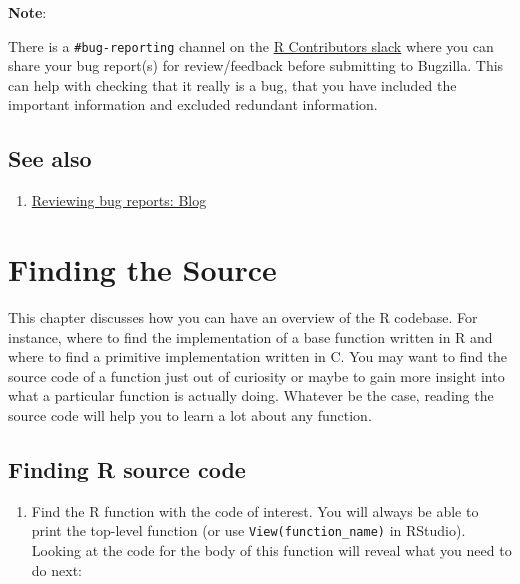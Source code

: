 \documentclass[
]{book}
\providecommand{\tightlist}{%
  \setlength{\itemsep}{0pt}\setlength{\parskip}{0pt}}
\begin{document}
\textbf{Note}:

There is a \texttt{\#bug-reporting} channel on the \href{https://r-contributors.slack.com/}{R Contributors slack} where you can share your bug report(s) for review/feedback before submitting to Bugzilla. This can help with checking that it really is a bug, that you have included the important information and excluded redundant information.

\section{See also}\label{see-also-2}

\begin{enumerate}
\def\labelenumi{\arabic{enumi}.}
\tightlist
\item
  \href{https://blog.r-project.org/2019/10/09/r-can-use-your-help-reviewing-bug-reports/index.html}{Reviewing bug reports: Blog}
\end{enumerate}

\chapter{Finding the Source}\label{FindSource}

This chapter discusses how you can have an overview of the R codebase. For instance, where to find the implementation of a base function written in R and where to find a primitive implementation written in C. You may want to find the source code of a function just out of curiosity or maybe to gain more insight into what a particular function is actually doing. Whatever be the case, reading the source code will help you to learn a lot about any function.

\section{Finding R source code}\label{finding-r-source-code}

\begin{enumerate}
\def\labelenumi{\arabic{enumi}.}
\tightlist
\item
  Find the R function with the code of interest. You will always be able to print the top-level function (or use \texttt{View(function\_name)} in RStudio). Looking at the code for the body of this function will reveal what you need to do next:
\end{enumerate}
\end{document}
